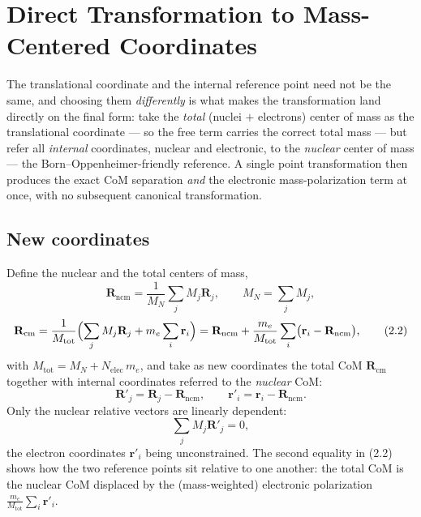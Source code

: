 \section{Direct Transformation to Mass-Centered Coordinates}

The translational coordinate and the internal reference point need not be the same, and choosing them \emph{differently} is what makes the transformation land directly on the final form: take the \emph{total} (nuclei $+$ electrons) center of mass as the translational coordinate --- so the free term carries the correct total mass --- but refer all \emph{internal} coordinates, nuclear and electronic, to the \emph{nuclear} center of mass --- the Born--Oppenheimer-friendly reference. A single point transformation then produces the exact CoM separation \emph{and} the electronic mass-polarization term at once, with no subsequent canonical transformation.

\subsection{New coordinates}

Define the nuclear and the total centers of mass,
\begin{equation}
\mathbf{R}_{\mathrm{ncm}} = \frac{1}{M_N}\sum_j M_j\mathbf{R}_j,\qquad M_N = \sum_j M_j, \tag{2.1}
\end{equation}
\begin{equation}
\mathbf{R}_{\mathrm{cm}} = \frac{1}{M_{\mathrm{tot}}}\Bigl(\sum_j M_j\mathbf{R}_j + m_e\sum_i\mathbf{r}_i\Bigr) = \mathbf{R}_{\mathrm{ncm}} + \frac{m_e}{M_{\mathrm{tot}}}\sum_i\bigl(\mathbf{r}_i-\mathbf{R}_{\mathrm{ncm}}\bigr), \tag{2.2}
\end{equation}
with $M_{\mathrm{tot}} = M_N + N_{\mathrm{elec}}\,m_e$, and take as new coordinates the total CoM $\mathbf{R}_{\mathrm{cm}}$ together with internal coordinates referred to the \emph{nuclear} CoM:
\begin{equation}
\mathbf{R}'_j = \mathbf{R}_j - \mathbf{R}_{\mathrm{ncm}},\qquad \mathbf{r}'_i = \mathbf{r}_i - \mathbf{R}_{\mathrm{ncm}}. \tag{2.3}
\end{equation}
Only the nuclear relative vectors are linearly dependent:
\begin{equation}
\sum_j M_j\mathbf{R}'_j = 0, \tag{2.4}
\end{equation}
the electron coordinates $\mathbf{r}'_i$ being unconstrained. The second equality in (2.2) shows how the two reference points sit relative to one another: the total CoM is the nuclear CoM displaced by the (mass-weighted) electronic polarization $\frac{m_e}{M_{\mathrm{tot}}}\sum_i\mathbf{r}'_i$.

